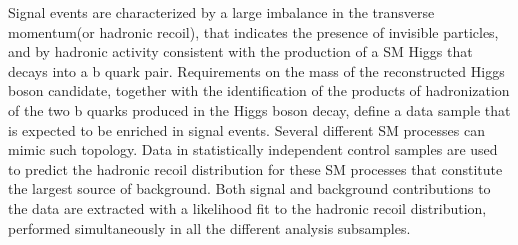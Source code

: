Signal events are characterized by a large imbalance in the transverse momentum(or hadronic recoil), that indicates the presence of invisible particles, and by hadronic activity consistent with the production of a SM Higgs that decays into a b quark pair. Requirements on the mass of the reconstructed Higgs boson candidate, together with the identification of the products of hadronization of the two b quarks produced in the Higgs boson decay, define a data sample that is expected to be enriched in signal events. Several different SM processes can mimic such topology. Data in statistically independent control samples are used to predict the hadronic recoil distribution for these SM processes that constitute the largest source of background.
Both signal and background contributions to the data are extracted with a likelihood fit to the hadronic recoil distribution, performed simultaneously in all the different analysis subsamples.
